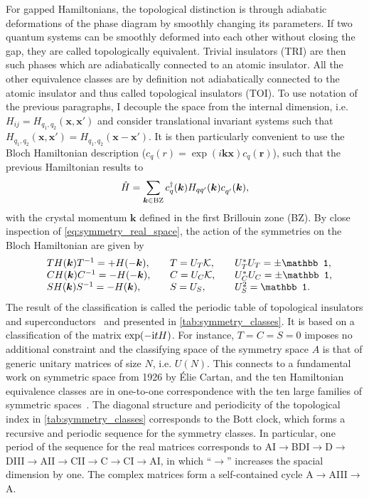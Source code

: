 For gapped Hamiltonians, the topological distinction is through adiabatic deformations of the phase diagram by smoothly changing its parameters.
If two quantum systems can be smoothly deformed into each other without closing the gap, they are called topologically equivalent.
Trivial insulators (TRI) are then such phases which are adiabatically connected to an atomic insulator.
All the other equivalence classes are by definition not adiabatically connected to the atomic insulator and thus called topological insulators (TOI).
To use notation of the previous paragraphs, I decouple the space from the internal dimension, i.e. $H_{ij}=H_{q_1,q_2}(\bm x,\bm x')$ and consider translational invariant systems such that $H_{q_1,q_2}(\bm x,\bm x')=H_{q_1,q_2}(\bm x-\bm x')$.
It is then particularly convenient to use the Bloch Hamiltonian description ($c_q(r)=\exp(i\bm k\bm x)c_q(\bm r)$), such that the previous Hamiltonian results to
\begin{align}
    \hat H = \sum_{\bm k\in {\rm BZ}} c^\dag_q(\bm k) H_{qq'}(\bm k)c^\pdag_{q'}(\bm k),
\end{align}
with the crystal momentum $\bm k$ defined in the first Brillouin zone (BZ).
By close inspection of \cref{eq:symmetry_real_space}, the action of the symmetries on the Bloch Hamiltonian are given by
\begin{align}
    \begin{array}{l l l l }
        & TH(\bm k)T^{-1} = +H(-\bm k)
        ,\quad
        & T = U_T\mathcal K
        ,\quad
        & U_T^*U_T = \pm\mathbb1,\\
        & CH(\bm k)C^{-1} = -H(-\bm k)
        ,\quad
        & C = U_C\mathcal K
        ,\quad
        & U_C^*U_C = \pm\mathbb1,\\
        & SH(\bm k)S^{-1} = -H(\bm k)
        ,\quad
        & S = U_S
        ,\qquad
        & U_S^2 = \mathbb1.
    \end{array}
    \label{eq:symmetry_momentum_space}
\end{align}
The result of the classification is called the periodic table of topological insulators and superconductors~\cite{Kitaev2009,Qi2008,Ryu2010,Schnyder2008} and presented in \cref{tab:symmetry_classes}.
It is based on a classification of the matrix $\exp(-\mathrm i t H)$.
For instance, $T=C=S=0$ imposes no additional constraint and the classifying space of the symmetry space $A$ is that of generic unitary matrices of size $N$, i.e. $U(N)$.
This connects to a fundamental work on symmetric space from 1926 by Élie Cartan, and the ten Hamiltonian equivalence classes are in one-to-one correspondence with the ten large families of symmetric spaces~\cite{Heinzner2005}.
The diagonal structure and periodicity of the topological index in \cref{tab:symmetry_classes} corresponds to the Bott clock, which forms a recursive and periodic sequence for the symmetry classes.
In particular, one period of the sequence for the real matrices corresponds to AI$\rightarrow$BDI$\rightarrow$D$\rightarrow$DIII$\rightarrow$AII$\rightarrow$CII$\rightarrow$C$\rightarrow$CI$\rightarrow$AI, in which ``$\rightarrow$'' increases the spacial dimension by one.
The complex matrices form a self-contained cycle A$\rightarrow$AIII$\rightarrow$A.

